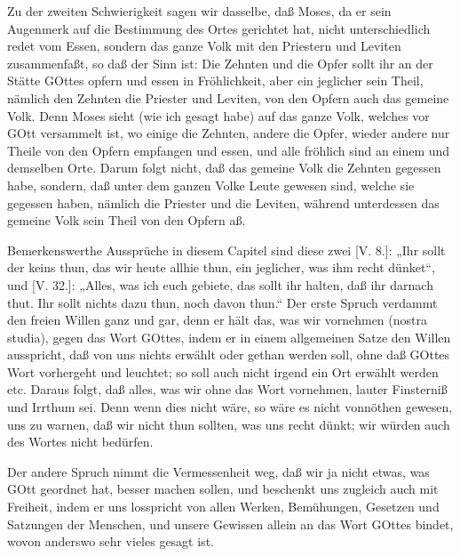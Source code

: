 Zu der zweiten Schwierigkeit sagen wir dasselbe, daß Moses, da er sein Augenmerk auf die Bestimmung des Ortes gerichtet hat, nicht unterschiedlich redet vom Essen, sondern das ganze Volk mit den Priestern und Leviten zusammenfaßt, so daß der Sinn ist: Die Zehnten und die Opfer sollt ihr an der Stätte GOttes opfern und essen in Fröhlichkeit, aber ein jeglicher sein Theil, nämlich den Zehnten die Priester und Leviten, von den Opfern auch das gemeine Volk. Denn Moses sieht (wie ich gesagt habe) auf das ganze Volk, welches vor GOtt versammelt ist, wo einige die Zehnten, andere die Opfer, wieder andere nur Theile von den Opfern empfangen und essen, und alle fröhlich sind an einem und demselben Orte. Darum folgt nicht, daß das gemeine Volk die Zehnten gegessen habe, sondern, daß unter dem ganzen Volke Leute gewesen sind, welche sie gegessen haben, nämlich die Priester und die Leviten, während unterdessen das gemeine Volk sein Theil von den Opfern aß.

Bemerkenswerthe Aussprüche in diesem Capitel sind diese zwei [V. 8.]: „Ihr sollt der keins thun, das wir heute allhie thun, ein jeglicher, was ihm recht dünket“, und [V. 32.]: „Alles, was ich euch gebiete, das sollt ihr halten, daß ihr darnach thut. Ihr sollt nichts dazu thun, noch davon thun.“ Der erste Spruch verdammt den freien Willen ganz und gar, denn er hält das, was wir vornehmen (nostra studia), gegen das Wort GOttes, indem er in einem allgemeinen Satze den Willen ausspricht, daß von uns nichts erwählt oder gethan werden soll, ohne daß GOttes Wort vorhergeht und leuchtet; so soll auch nicht irgend ein Ort erwählt werden etc. Daraus folgt, daß alles, was wir ohne das Wort vornehmen, lauter Finsterniß und Irrthum sei. Denn wenn dies nicht wäre, so wäre es nicht vonnöthen gewesen, uns zu warnen, daß wir nicht thun sollten, was uns recht dünkt; wir würden auch des Wortes nicht bedürfen.

Der andere Spruch nimmt die Vermessenheit weg, daß wir ja nicht etwas, was GOtt geordnet hat, besser machen sollen, und beschenkt uns zugleich auch mit Freiheit, indem er uns losspricht von allen Werken, Bemühungen, Gesetzen und Satzungen der Menschen, und unsere Gewissen allein an das Wort GOttes bindet, wovon anderswo sehr vieles gesagt ist.

